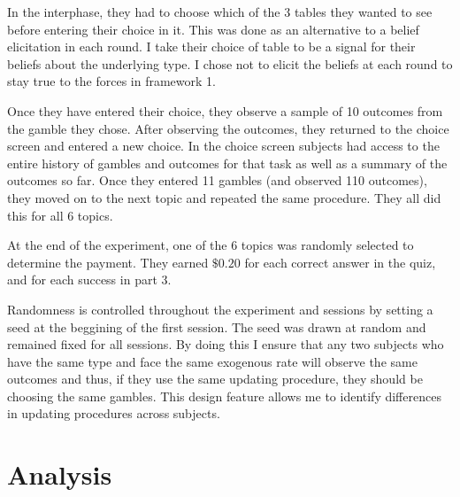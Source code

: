 \documentclass[
  12pt,
]{article}
\begin{document}
In the interphase, they had to choose which of the 3 tables they wanted
to see before entering their choice in it. This was done as an
alternative to a belief elicitation in each round. I take their choice
of table to be a signal for their beliefs about the underlying type. I
chose not to elicit the beliefs at each round to stay true to the forces
in framework 1.

Once they have entered their choice, they observe a sample of 10
outcomes from the gamble they chose. After observing the outcomes, they
returned to the choice screen and entered a new choice. In the choice
screen subjects had access to the entire history of gambles and outcomes
for that task as well as a summary of the outcomes so far. Once they
entered 11 gambles (and observed 110 outcomes), they moved on to the
next topic and repeated the same procedure. They all did this for all 6
topics.

At the end of the experiment, one of the 6 topics was randomly selected
to determine the payment. They earned \(\$0.20\) for each correct answer
in the quiz, and for each success in part 3.

Randomness is controlled throughout the experiment and sessions by
setting a seed at the beggining of the first session. The seed was drawn
at random and remained fixed for all sessions. By doing this I ensure
that any two subjects who have the same type and face the same exogenous
rate will observe the same outcomes and thus, if they use the same
updating procedure, they should be choosing the same gambles. This
design feature allows me to identify differences in updating procedures
across subjects.

\hypertarget{analysis}{%
\section{Analysis}\label{analysis}}

\renewcommand\refname{Conclusion}
  
\end{document}
